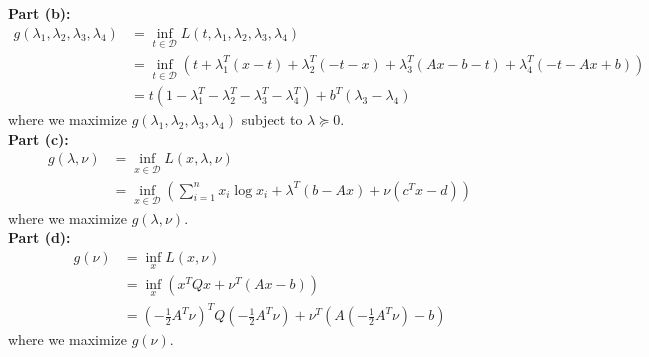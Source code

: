 \documentclass[11pt]{article}
\begin{document}
\begin{homeworkProblem}
    \pagebreak

    \textbf{Part (b):}
    \begin{align*}
        g(\lambda_1, \lambda_2, \lambda_3, \lambda_4) & = \inf_{t \in \mathcal{D}} L(t, \lambda_1, \lambda_2, \lambda_3, \lambda_4)                                                          \\
                                                      & = \inf_{t \in \mathcal{D}} \left( t + \lambda_1^T ( x- t) + \lambda_2^T (-t-x) + \lambda_3^T(Ax-b-t) + \lambda_4^T(-t -Ax+b) \right) \\
                                                      & = t(1 - \lambda_1^T - \lambda_2^T - \lambda_3^T - \lambda_4^T) + b^T(\lambda_3 - \lambda_4)
    \end{align*} where we maximize $g(\lambda_1, \lambda_2, \lambda_3, \lambda_4)$ subject to $\lambda \succeq 0$. \\

    \textbf{Part (c):}
    \begin{align*}
        g(\lambda, \nu) & = \inf_{x \in \mathcal{D}} L (x, \lambda, \nu)                                                             \\
                        & = \inf_{x \in \mathcal{D}} \left( \sum_{i=1}^n x_i \log x_i + \lambda^T (b - Ax) + \nu (c^T x - d) \right)
    \end{align*} where we maximize $g(\lambda, \nu)$. \\

    \textbf{Part (d):}
    \begin{align*}
        g(\nu) & = \inf_{x} L (x, \nu)                                                                     \\
               & = \inf_{x} \left( x^T Q x + \nu^T (Ax - b) \right)                                        \\
               & = (-\frac{1}{2} A^T \nu)^T Q (-\frac{1}{2} A^T \nu) + \nu^T (A(-\frac{1}{2} A^T \nu) - b)
    \end{align*} where we maximize $g(\nu)$.


\end{homeworkProblem}
\end{document}
